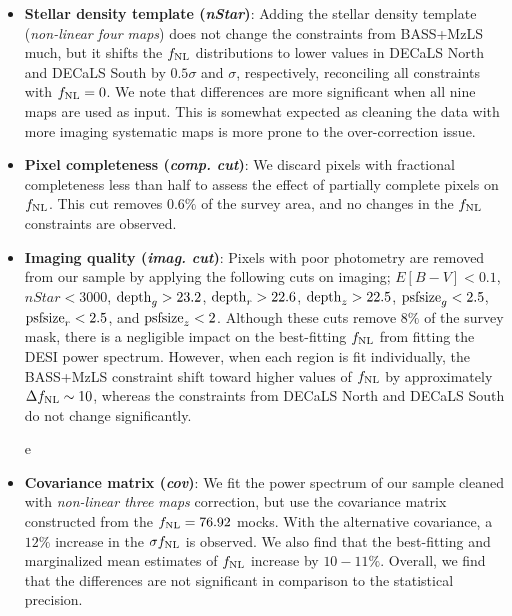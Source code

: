 \begin{itemize}[itemindent=*]
\item \textbf{Stellar density template (\textit{nStar})}: Adding the stellar density template (\textit{non-linear four maps}) does not change the constraints from BASS+MzLS much, but it shifts the $f_{\rm NL}$ distributions to lower values in DECaLS North and DECaLS South by $0.5\sigma$ and $\sigma$, respectively, reconciling all constraints with $f_{\rm NL}=0$. We note that differences are more significant when all nine maps are used as input. This is somewhat expected as cleaning the data with more imaging systematic maps is more prone to the over-correction issue.   

\item \textbf{Pixel completeness (\textit{comp. cut})}: We discard pixels with fractional completeness less than half to assess the effect of partially complete pixels on $f_{\rm NL}$. This cut removes $0.6\%$ of the survey area, and no changes in the $f_{\rm NL}$ constraints are observed.

\item \textbf{Imaging quality (\textit{imag. cut})}: Pixels with poor photometry are removed from our sample by applying the following cuts on imaging; $E[B-V]<0.1$, $nStar < 3000$, ${\rm depth}_{g} > 23.2$, ${\rm depth}_{r} > 22.6$, ${\rm depth}_{z} > 22.5$, ${\rm psfsize}_{g}<2.5$, ${\rm psfsize}_{r}<2.5$, and ${\rm psfsize}_{z}<2$. Although these cuts remove $8\%$ of the survey mask, there is a negligible impact on the best-fitting $f_{\rm NL}$ from fitting the DESI power spectrum. However, when each region is fit individually, the BASS+MzLS constraint shift toward higher values of $f_{\rm NL}$ by approximately $\Delta f_{\rm NL} \sim 10$, whereas the constraints from DECaLS North and DECaLS South do not change significantly. 

e\item \textbf{Covariance matrix (\textit{cov})}: We fit the power spectrum of our sample cleaned with \textit{non-linear three maps} correction, but use the covariance matrix constructed from the $f_{\rm NL}=76.92$ mocks. With the alternative covariance, a $12\%$ increase in the $\sigma f_{\rm NL}$ is observed. We also find that the best-fitting and marginalized mean estimates of $f_{\rm NL}$ increase by $10-11\%$. Overall, we find that the differences are not significant in comparison to the statistical precision.


\end{itemize}
